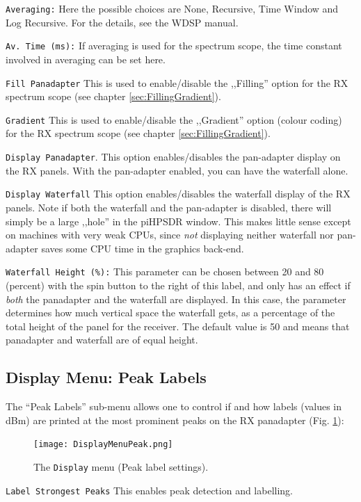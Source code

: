 \documentclass[12pt]{book}
\def\rett#1{\texttt{\color{red}#1}}
\def\bltt#1{\texttt{\color{blue}#1}}
\def\pH{pi\-HPSDR\xspace}
\begin{document}
\rett{Averaging:} Here the possible choices are None, Recursive, Time Window and
Log Recursive. For the details, see the WDSP manual.

\rett{Av. Time (ms):} If averaging is used for the spectrum scope, the time
constant involved in averaging can be set here.

\rett{Fill Panadapter} This is used to enable/disable the ,,Filling'' option
for the RX  spectrum scope (see chapter \ref{sec:FillingGradient}).

\rett{Gradient} This is used to enable/disable the ,,Gradient'' option
(colour coding) for the RX spectrum scope (see chapter \ref{sec:FillingGradient}).

\rett{Display Panadapter}. This option enables/disables the pan-adapter display
on the RX panels. With the pan-adapter enabled, you can have the waterfall alone.

\rett{Display Waterfall} This option enables/disables the waterfall display
of the RX panels. Note if both the waterfall and the pan-adapter is disabled,
there will simply be a large ,,hole'' in the \pH window. This makes little sense
except on machines with very weak CPUs, since \textit{not} displaying neither waterfall
nor pan-adapter saves some CPU time in the graphics back-end.

\rett{Waterfall Height (\%):} This parameter can be chosen between 20 and 80
(percent) with the spin button to the right of this label,
and only has an effect if \textit{both} the panadapter and the waterfall are displayed.
In this case, the parameter determines how much vertical space
the waterfall gets, as a percentage of the total height of the panel for the
receiver. The default value is 50 and means that panadapter and waterfall
are of equal height.

\subsection{Display Menu: Peak Labels}

The ``Peak Labels'' sub-menu allows one to control if and how labels
(values in dBm) are printed at the most prominent peaks on the
RX panadapter (Fig. \ref{fig:DisplayMenuPeak}):


\begin{figure}[ht]
\center
\texttt{[image: DisplayMenuPeak.png]}
\caption{The \bltt{Display} menu (Peak label settings).}
\label{fig:DisplayMenuPeak}
\end{figure}

\rett{Label Strongest Peaks} This enables peak detection and labelling.
\end{document}
